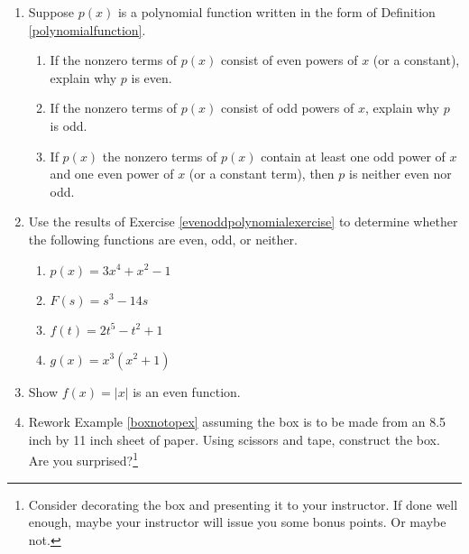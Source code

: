 \documentclass{ximera}
\begin{document}
\begin{enumerate}
\setcounter{enumi}{\value{HW}}

\item  \label{evenoddpolynomialexercise} Suppose $p(x)$ is a polynomial function written in the form of  Definition \ref{polynomialfunction}.  

\begin{enumerate}

\item  If the nonzero terms of $p(x)$ consist of even powers of $x$ (or a constant), explain why $p$ is even.

\item   If the nonzero terms of $p(x)$ consist of odd powers of $x$, explain why $p$ is odd.

\item  If $p(x)$ the nonzero terms of $p(x)$  contain at least one odd power of $x$ and one even power of $x$ (or a constant term), then $p$ is neither even nor odd.

\end{enumerate}

\newpage

\item  Use the results of Exercise \ref{evenoddpolynomialexercise} to determine whether the following functions are even, odd, or neither.

\begin{multicols}{4}
\begin{enumerate}

\item  $p(x) = 3x^4 + x^2 - 1$

\item  $F(s) = s^3 - 14s$

\item  $f(t) = 2t^5 - t^2 + 1$

\item  $g(x) =x^3(x^2+1)$

\end{enumerate}

\end{multicols}

\item  Show  $f(x) = |x|$ is an even function.


\item  Rework Example \ref{boxnotopex} assuming the box is to be made from an 8.5 inch by 11 inch sheet of paper. Using scissors and tape, construct the box.  Are you surprised?\footnote{Consider decorating the box and presenting it to your instructor. If done well enough, maybe your instructor will issue you some bonus points.  Or maybe not.}


\end{enumerate}
\end{document}
